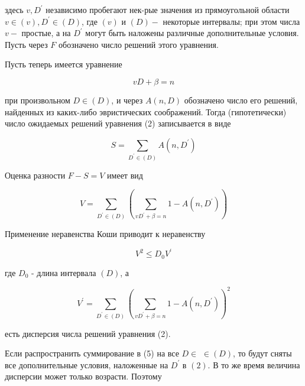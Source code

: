 \documentclass[10pt]{article}
\begin{document}
здесь $v, D^{\prime}$ независимо пробегают нек-рые значения из прямоугольной области $v \in(v), D^{\prime} \in(D)$, где $(v)$ и $(D)-$ некоторые интервалы; при этом числа $v-$ простые, а на $D^{\prime}$ могут быть наложены различные дополнительные условия. Пусть через $F$ обозначено число решений этого уравнения.



Пусть теперь имеется уравнение



\[

v D+\beta=n

\]



при произвольном $D \in(D)$, и через $A(n, D)$ обозначено число его решений, найденных из каких-либо эвристических соображений. Тогда (гипотетически) число ожидаемых решений уравнения (2) записывается в виде



\[

S=\sum_{D^{\prime} \in(D)} A\left(n, D^{\prime}\right)

\]



Оценка разности $F-S=V$ имеет вид



\[

V=\sum_{D^{\prime} \in(D)}\left(\sum_{v D^{\prime}+\beta=n} 1-A\left(n, D^{\prime}\right)\right)

\]



Применение неравенства Коши приводит к неравенству



\[

V^{2} \leqslant D_{0} V^{\prime}

\]



где $D_{0}$ - длина интервала $(D)$, а



\[

V^{\prime}=\sum_{D^{\prime} \in(D)}\left(\sum_{v D^{\prime}+\beta=n} 1-A\left(n, D^{\prime}\right)\right)^{2}

\]



есть дисперсия числа решений уравнения (2).



Если распространить суммирование в (5) на все $D \in$ $\in(D)$, то будут сняты все дополнительные условия, наложенные на $D^{\prime}$ в $(2)$. В то же время величина дисперсии может только возрасти. Поэтому
\end{document}
